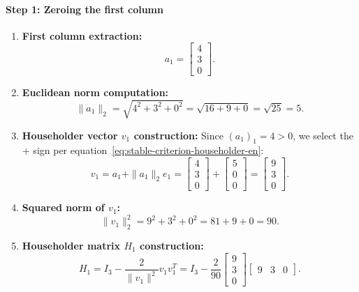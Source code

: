 \begin{example}
\paragraph{Step 1: Zeroing the first column}
\begin{enumerate}
    \item \textbf{First column extraction:}
    \begin{equation}
        a_1 = \begin{bmatrix} 4 \\ 3 \\ 0 \end{bmatrix}.
    \end{equation}
    \item \textbf{Euclidean norm computation:}
    \begin{equation}
        \|a_1\|_2 = \sqrt{4^2 + 3^2 + 0^2} = \sqrt{16 + 9 + 0} = \sqrt{25} = 5.
    \end{equation}
    \item \textbf{Householder vector $v_1$ construction:}
    Since $(a_1)_1 = 4 > 0$, we select the $+$ sign per equation~\eqref{eq:stable-criterion-householder-en}:
    \begin{equation}
        v_1 = a_1 + \|a_1\|_2 e_1 = \begin{bmatrix} 4 \\ 3 \\ 0 \end{bmatrix} + \begin{bmatrix} 5 \\ 0 \\ 0 \end{bmatrix} = \begin{bmatrix} 9 \\ 3 \\ 0 \end{bmatrix}.
    \end{equation}
    \item \textbf{Squared norm of $v_1$:}
    \begin{equation}
        \|v_1\|_2^2 = 9^2 + 3^2 + 0^2 = 81 + 9 + 0 = 90.
    \end{equation}
    \item \textbf{Householder matrix $H_1$ construction:}
    \begin{equation}
        H_1 = I_3 - \frac{2}{\|v_1\|^2} v_1 v_1^T = I_3 - \frac{2}{90} \begin{bmatrix} 9 \\ 3 \\ 0 \end{bmatrix} \begin{bmatrix} 9 & 3 & 0 \end{bmatrix}.

\end{equation}
\end{enumerate}
\end{example}
